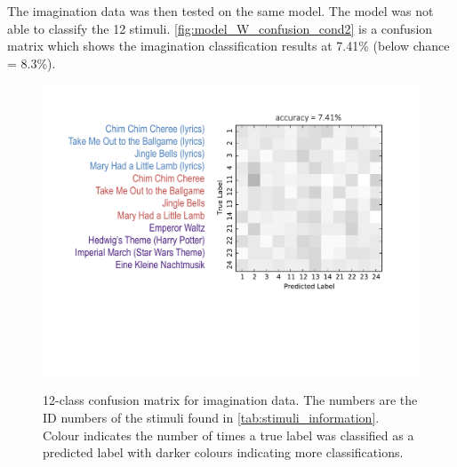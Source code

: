 The imagination data was then tested on the same model. 
The model was not able to classify the 12 stimuli. 
\autoref{fig:model_W_confusion_cond2} is a confusion matrix which shows the imagination classification results at 7.41\% (below chance = 8.3\%). 
\begin{figure}[htb] 
  \begin{center}
    \includegraphics[width=.83\textwidth,keepaspectratio=true]{Figures/model_W_confusion_cond2}
   \\\vspace{-0.8em}
    \caption{12-class confusion matrix for imagination data. The numbers are the ID numbers of the stimuli found in \autoref{tab:stimuli_information}. Colour indicates the number of times a true label was classified as a predicted label with darker colours indicating more classifications.}
        \label{fig:model_W_confusion_cond2}
  \end{center}
  \vspace{-1em}
\end{figure}

